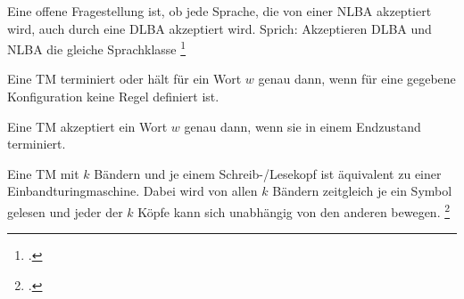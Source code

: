\documentclass{lehramt-informatik-haupt}
\begin{document}
Eine offene Fragestellung ist, ob jede Sprache, die von einer NLBA
akzeptiert wird, auch durch eine DLBA akzeptiert wird. Sprich:
Akzeptieren DLBA und NLBA die gleiche Sprachklasse
\footcite[Seite 10]{theo:fs:3}

Eine TM terminiert oder hält für ein Wort $w$ genau dann, wenn für
eine gegebene Konfiguration keine Regel definiert ist.

Eine TM akzeptiert ein Wort $w$ genau dann, wenn sie in einem
Endzustand terminiert.

Eine TM mit $k$ Bändern und je einem Schreib-/Lesekopf ist
äquivalent zu einer Einbandturingmaschine. Dabei wird von allen $k$
Bändern zeitgleich je ein Symbol gelesen und jeder der $k$ Köpfe
kann sich unabhängig von den anderen bewegen.
\footcite[Seite 26]{theo:fs:3}

\literatur
\end{document}
